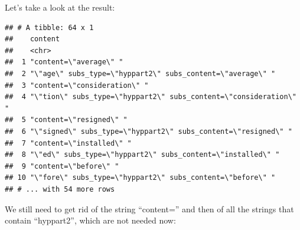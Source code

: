 \documentclass[]{gitbook}
\newenvironment{Shaded}{\begin{snugshade}}{\end{snugshade}}
\newcommand{\DataTypeTok}[1]{\textcolor[rgb]{0.13,0.29,0.53}{#1}}
\newcommand{\KeywordTok}[1]{\textcolor[rgb]{0.13,0.29,0.53}{\textbf{#1}}}
\newcommand{\NormalTok}[1]{#1}
\newcommand{\OperatorTok}[1]{\textcolor[rgb]{0.81,0.36,0.00}{\textbf{#1}}}
\newcommand{\OtherTok}[1]{\textcolor[rgb]{0.56,0.35,0.01}{#1}}
\newcommand{\StringTok}[1]{\textcolor[rgb]{0.31,0.60,0.02}{#1}}
\begin{document}
\begin{Shaded}
\end{Shaded}

Let's take a look at the result:

\begin{Shaded}
\end{Shaded}

\begin{verbatim}
## # A tibble: 64 x 1
##    content                                                          
##    <chr>                                                            
##  1 "content=\"average\" "                                           
##  2 "\"age\" subs_type=\"hyppart2\" subs_content=\"average\" "       
##  3 "content=\"consideration\" "                                     
##  4 "\"tion\" subs_type=\"hyppart2\" subs_content=\"consideration\" "
##  5 "content=\"resigned\" "                                          
##  6 "\"signed\" subs_type=\"hyppart2\" subs_content=\"resigned\" "   
##  7 "content=\"installed\" "                                         
##  8 "\"ed\" subs_type=\"hyppart2\" subs_content=\"installed\" "      
##  9 "content=\"before\" "                                            
## 10 "\"fore\" subs_type=\"hyppart2\" subs_content=\"before\" "       
## # ... with 54 more rows
\end{verbatim}

We still need to get rid of the string ``content='' and then of all the strings that contain ``hyppart2'',
which are not needed now:
\end{document}
